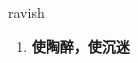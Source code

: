 
\begin{frame}
{\huge ravish}
\begin{center}
\begin{enumerate}\Large
  \item \textbf{使陶醉，使沉迷}
\end{enumerate}
\end{center}
\end{frame}
